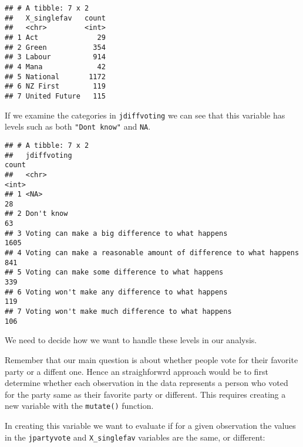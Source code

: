 \documentclass[]{article}
\newenvironment{Shaded}{\begin{snugshade}}{\end{snugshade}}
\newcommand{\KeywordTok}[1]{\textcolor[rgb]{0.13,0.29,0.53}{\textbf{#1}}}
\newcommand{\DataTypeTok}[1]{\textcolor[rgb]{0.13,0.29,0.53}{#1}}
\newcommand{\StringTok}[1]{\textcolor[rgb]{0.31,0.60,0.02}{#1}}
\newcommand{\OperatorTok}[1]{\textcolor[rgb]{0.81,0.36,0.00}{\textbf{#1}}}
\newcommand{\NormalTok}[1]{#1}
\begin{document}
\begin{verbatim}
## # A tibble: 7 x 2
##   X_singlefav   count
##   <chr>         <int>
## 1 Act              29
## 2 Green           354
## 3 Labour          914
## 4 Mana             42
## 5 National       1172
## 6 NZ First        119
## 7 United Future   115
\end{verbatim}

If we examine the categories in \texttt{jdiffvoting} we can see that
this variable has levels such as both
\texttt{"Don\textquotesingle{}t\ know"} and \texttt{NA}.

\begin{Shaded}
\end{Shaded}

\begin{verbatim}
## # A tibble: 7 x 2
##   jdiffvoting                                                       count
##   <chr>                                                             <int>
## 1 <NA>                                                                 28
## 2 Don't know                                                           63
## 3 Voting can make a big difference to what happens                   1605
## 4 Voting can make a reasonable amount of difference to what happens   841
## 5 Voting can make some difference to what happens                     339
## 6 Voting won't make any difference to what happens                    119
## 7 Voting won't make much difference to what happens                   106
\end{verbatim}

We need to decide how we want to handle these levels in our analysis.

Remember that our main question is about whether people vote for their
favorite party or a diffent one. Hence an straighforwrd approach would
be to first determine whether each observation in the data represents a
person who voted for the party same as their favorite party or
different. This requires creating a new variable with the
\texttt{mutate()} function.

In creating this variable we want to evaluate if for a given observation
the values in the \texttt{jpartyvote} and \texttt{X\_singlefav}
variables are the same, or different:
\end{document}

